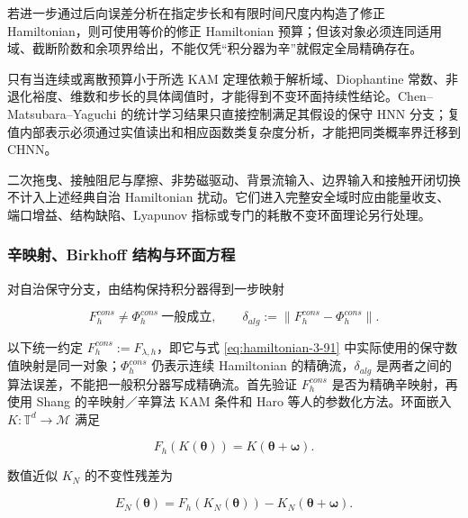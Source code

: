 若进一步通过后向误差分析在指定步长和有限时间尺度内构造了修正 Hamiltonian，则可使用等价的修正 Hamiltonian 预算；但该对象必须连同适用域、截断阶数和余项界给出，不能仅凭``积分器为辛''就假定全局精确存在。

只有当连续或离散预算小于所选 KAM 定理依赖于解析域、Diophantine 常数、非退化裕度、维数和步长的具体阈值时，才能得到不变环面持续性结论。Chen--Matsubara--Yaguchi 的统计学习结果只直接控制满足其假设的保守 HNN 分支；复值内部表示必须通过实值读出和相应函数类复杂度分析，才能把同类概率界迁移到 CHNN\cite{Chen2022KAMSLT}。

二次拖曳、接触阻尼与摩擦、非势磁驱动、背景流输入、边界输入和接触开闭切换不计入上述经典自治 Hamiltonian 扰动。它们进入完整安全域时应由能量收支、端口增益、结构缺陷、Lyapunov 指标或专门的耗散不变环面理论另行处理。

\subsubsection{辛映射、Birkhoff 结构与环面方程}\label{sec:hamiltonian-3-7-5}

对自治保守分支，由结构保持积分器得到一步映射

\begin{equation}
\label{eq:hamiltonian-3-94}
F_{h}^{cons}\neq\Phi_{h}^{cons}\ \text{一般成立},\qquad \delta_{alg}:=\lVert F_{h}^{cons}-\Phi_{h}^{cons}\rVert.
\end{equation}

以下统一约定 \(F_{h}^{cons}:=F_{\lambda,h}\)，即它与式 \eqref{eq:hamiltonian-3-91} 中实际使用的保守数值映射是同一对象；\(\Phi_h^{cons}\) 仍表示连续 Hamiltonian 的精确流，\(\delta_{alg}\) 是两者之间的算法误差，不能把一般积分器写成精确流。首先验证 \(F_{h}^{cons}\) 是否为精确辛映射，再使用 Shang 的辛映射／辛算法 KAM 条件和 Haro 等人的参数化方法\cite{FengQin2010,Shang1999KAMAlgorithms,Shang2000KAMMappings,Haro2016Parameterization}。环面嵌入 \(K:\mathbb{T}^{d} \rightarrow \mathcal{M}\) 满足\cite{Haro2016Parameterization}

\begin{equation}
\label{eq:hamiltonian-3-95}
\boxed{F_{h}\left( K\left( \bm{\theta} \right) \right) = K\left( \bm{\theta} + \bm{\omega} \right).}
\end{equation}

数值近似 \(K_{N}\) 的不变性残差为

\begin{equation}
\label{eq:hamiltonian-3-96}
E_{N}\left( \bm{\theta} \right) = F_{h}\left( K_{N}\left( \bm{\theta} \right) \right) - K_{N}\left( \bm{\theta} + \bm{\omega} \right).
\end{equation}

